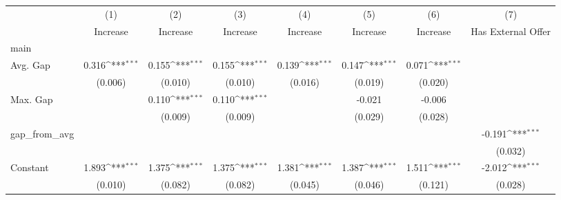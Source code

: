 {
\def\sym#1{\ifmmode^{#1}\else\(^{#1}\)\fi}
\begin{tabular}{l*{7}{c}}
\hline\hline
                    &\multicolumn{1}{c}{(1)}&\multicolumn{1}{c}{(2)}&\multicolumn{1}{c}{(3)}&\multicolumn{1}{c}{(4)}&\multicolumn{1}{c}{(5)}&\multicolumn{1}{c}{(6)}&\multicolumn{1}{c}{(7)}\\
                    &\multicolumn{1}{c}{Increase}&\multicolumn{1}{c}{Increase}&\multicolumn{1}{c}{Increase}&\multicolumn{1}{c}{Increase}&\multicolumn{1}{c}{Increase}&\multicolumn{1}{c}{Increase}&\multicolumn{1}{c}{Has External Offer}\\
\hline
main                &                     &                     &                     &                     &                     &                     &                     \\
Avg. Gap            &       0.316\sym{***}&       0.155\sym{***}&       0.155\sym{***}&       0.139\sym{***}&       0.147\sym{***}&       0.071\sym{***}&                     \\
                    &     (0.006)         &     (0.010)         &     (0.010)         &     (0.016)         &     (0.019)         &     (0.020)         &                     \\
[1em]
Max. Gap            &                     &       0.110\sym{***}&       0.110\sym{***}&                     &      -0.021         &      -0.006         &                     \\
                    &                     &     (0.009)         &     (0.009)         &                     &     (0.029)         &     (0.028)         &                     \\
[1em]
gap\_from\_avg        &                     &                     &                     &                     &                     &                     &      -0.191\sym{***}\\
                    &                     &                     &                     &                     &                     &                     &     (0.032)         \\
[1em]
Constant            &       1.893\sym{***}&       1.375\sym{***}&       1.375\sym{***}&       1.381\sym{***}&       1.387\sym{***}&       1.511\sym{***}&      -2.012\sym{***}\\
                    &     (0.010)         &     (0.082)         &     (0.082)         &     (0.045)         &     (0.046)         &     (0.121)         &     (0.028)         \\

\end{tabular}}
